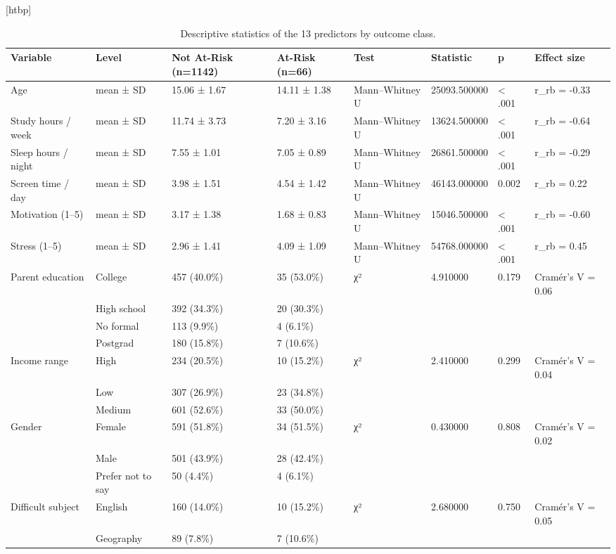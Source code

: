\begin{table}
\small[htbp]
\caption{Descriptive statistics of the 13 predictors by outcome class.}
\label{tab:S02_descriptives_by_class}
\begin{tabular}{llllllll}
\toprule
Variable & Level & Not At-Risk (n=1142) & At-Risk (n=66) & Test & Statistic & p & Effect size \\
\midrule
Age & mean ± SD & 15.06 ± 1.67 & 14.11 ± 1.38 & Mann–Whitney U & 25093.500000 & < .001 & r\_rb = -0.33 \\
Study hours / week & mean ± SD & 11.74 ± 3.73 & 7.20 ± 3.16 & Mann–Whitney U & 13624.500000 & < .001 & r\_rb = -0.64 \\
Sleep hours / night & mean ± SD & 7.55 ± 1.01 & 7.05 ± 0.89 & Mann–Whitney U & 26861.500000 & < .001 & r\_rb = -0.29 \\
Screen time / day & mean ± SD & 3.98 ± 1.51 & 4.54 ± 1.42 & Mann–Whitney U & 46143.000000 & 0.002 & r\_rb = 0.22 \\
Motivation (1–5) & mean ± SD & 3.17 ± 1.38 & 1.68 ± 0.83 & Mann–Whitney U & 15046.500000 & < .001 & r\_rb = -0.60 \\
Stress (1–5) & mean ± SD & 2.96 ± 1.41 & 4.09 ± 1.09 & Mann–Whitney U & 54768.000000 & < .001 & r\_rb = 0.45 \\
Parent education & College & 457 (40.0\%) & 35 (53.0\%) & χ² & 4.910000 & 0.179 & Cramér's V = 0.06 \\
 & High school & 392 (34.3\%) & 20 (30.3\%) &  &  &  &  \\
 & No formal & 113 (9.9\%) & 4 (6.1\%) &  &  &  &  \\
 & Postgrad & 180 (15.8\%) & 7 (10.6\%) &  &  &  &  \\
Income range & High & 234 (20.5\%) & 10 (15.2\%) & χ² & 2.410000 & 0.299 & Cramér's V = 0.04 \\
 & Low & 307 (26.9\%) & 23 (34.8\%) &  &  &  &  \\
 & Medium & 601 (52.6\%) & 33 (50.0\%) &  &  &  &  \\
Gender & Female & 591 (51.8\%) & 34 (51.5\%) & χ² & 0.430000 & 0.808 & Cramér's V = 0.02 \\
 & Male & 501 (43.9\%) & 28 (42.4\%) &  &  &  &  \\
 & Prefer not to say & 50 (4.4\%) & 4 (6.1\%) &  &  &  &  \\
Difficult subject & English & 160 (14.0\%) & 10 (15.2\%) & χ² & 2.680000 & 0.750 & Cramér's V = 0.05 \\
 & Geography & 89 (7.8\%) & 7 (10.6\%) &  &  &  &  \\

\end{tabular}
\end{table}
